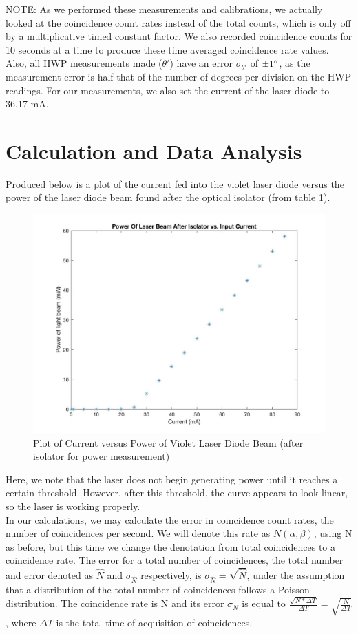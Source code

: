 \documentclass{article}
\begin{document}
    NOTE: As we performed these measurements and calibrations, we actually looked at the coincidence count rates instead of the total counts, which is only off by a multiplicative timed constant factor. We also recorded coincidence counts for 10 seconds at a time to produce these time averaged coincidence rate values. Also, all HWP measurements made ($\theta'$) have an error $\sigma_{\theta'}$ of $\pm1\degree$, as the measurement error is half that of the number of degrees per division on the HWP readings. For our measurements, we also set the current of the laser diode to 36.17 mA.

\section{Calculation and Data Analysis}
    Produced below is a plot of the current fed into the violet laser diode versus the power of the laser diode beam found after the optical isolator (from table 1). 
    \begin{figure}[H] %
    \centering
    \includegraphics[scale = 0.3]{1.jpg}
    \caption{Plot of Current versus Power of Violet Laser Diode Beam (after isolator for power measurement)}
    \label{fig:my_label}
\end{figure}
     Here, we note that the laser does not begin generating power until it reaches a certain threshold. However, after this threshold, the curve appears to look linear, so the laser is working properly.
    \\\indent In our calculations, we may calculate the error in coincidence count rates, the number of coincidences per second. We will denote this rate as $N(\alpha,\beta)$, using N as before, but this time we change the denotation from total coincidences to a coincidence rate. The error for a total number of coincidences, the total number and error denoted as $\hat{N}$ and $\sigma_{\hat{N}}$ respectively, is $\sigma_{\hat{N}} = \sqrt{\hat{N}}$, under the assumption that a distribution of the total number of coincidences follows a Poisson distribution. The coincidence rate is N and its error $\sigma_N$ is equal to $\frac{\sqrt{N*\Delta T}}{\Delta T} = \sqrt{\frac{N}{\Delta T}}$, where $\Delta T$ is the total time of acquisition of coincidences. 
\end{document}
